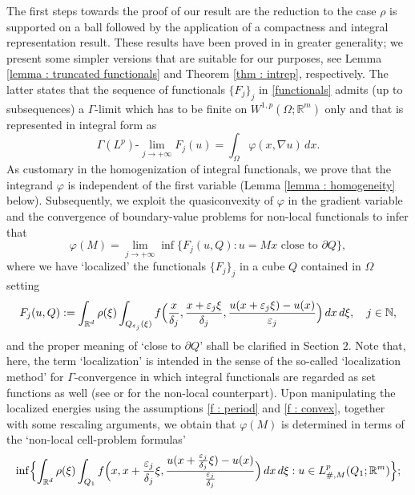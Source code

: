 \documentclass{article}
\theoremstyle{definition}
\newcommand{\f}{\varphi}
\newcommand{\ej}{\varepsilon_j}
\newcommand{\dej}{\delta_j}
\newcommand{\N}{\mathbb{N}}
\newcommand{\R}{\mathbb{R}}
\begin{document}
The first steps towards the proof of our result are the reduction to the case $\rho$ is supported on a ball followed by the application of a compactness and integral representation result. These results have been proved in \cite{AABPT} in greater generality; we present some simpler versions that are suitable for our purposes, see Lemma \ref{lemma : truncated functionals} and Theorem \ref{thm : intrep}, respectively. The latter states that the sequence of functionals $\{F_j\}_j$ in \eqref{functionals} admits (up to subsequences) a $\Gamma$-limit which has to be finite on $W^{1,p}(\Omega;\R^m)$ only and that is represented in integral form as
\begin{equation*}
  \Gamma(L^p)\text{-}\lim_{j\to+\infty} F_{j}(u)  = \int_\Omega \f(x,\nabla u)\, dx.
\end{equation*}
 As customary in the homogenization of integral functionals, we prove that the integrand $\f$ is independent of the first variable (Lemma \ref{lemma : homogeneity} below). Subsequently, we exploit the quasiconvexity of $\f$ in the gradient variable and the convergence of boundary-value problems for non-local functionals to infer that
\begin{equation*}
      \f(M) = \lim_{j\to+\infty} \inf\{ F_j(u, Q) : u=Mx \text{ close to } \partial Q\},
    \end{equation*}
where we have `localized' the functionals $\{F_j\}_j$ in a cube $Q$ contained in $\Omega$ setting
\begin{equation*}
    F_j(u,Q)  := \int_{\R^d} \rho(\xi)\int_{Q_{\ej}(\xi)} f\Bigl(\frac{x}{\dej},\frac{x+\ej\xi}{\dej},\frac{u(x+\ej\xi)-u(x)}{\ej}\Bigr)\, dx\,d\xi, \quad j\in\N,
\end{equation*}
and the proper meaning of `close to $\partial Q$' shall be clarified in Section $2$. Note that, here, the term `localization' is intended in the sense of the so-called `localization method' for $\Gamma$-convergence in which integral functionals are regarded as set functions as well (see \cite[Chapter 9]{BDF} or \cite[Chapter 5]{AABPT} for the non-local counterpart). Upon manipulating the localized energies using the assumptions \eqref{f : period} and \eqref{f : convex}, together with some rescaling arguments, we obtain that $\f(M)$ is determined in terms of the `non-local cell-problem formulas'
\begin{equation}\label{min_j}
    \inf\Bigl\{ \int_{\R^d} \rho(\xi)\int_{Q_1} f\Bigl(x,x+\frac{\ej}{\dej}\xi,\frac{u(x+\frac{\ej}{\dej}\xi)-u(x)}{\frac{\ej}{\dej}}\Bigr)\, dx\,d\xi : u\in L^p_{\#,M}(Q_1;\R^m) \Bigr\};
\end{equation}
\end{document}
